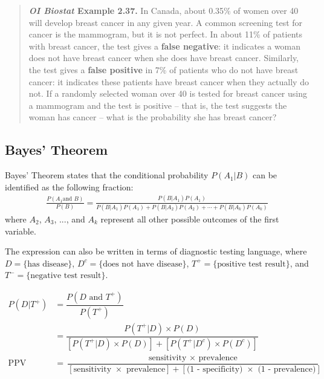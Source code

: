 \documentclass{report}\usepackage[]{graphicx}\usepackage[]{color}
\begin{document}
\begin{quotation}

\textbf{\textit{OI Biostat} Example 2.37.} In Canada, about 0.35\% of women over 40 will develop breast cancer in any given year. A common screening test for cancer is the mammogram, but it is not perfect. In about 11\% of patients with breast cancer, the test gives a \textbf{false negative}: it indicates a woman does not have breast cancer when she does have breast cancer. Similarly, the test gives a \textbf{false positive} in 7\% of patients who do not have breast cancer: it indicates these patients have breast cancer when they actually do not. If a randomly selected woman over 40 is tested for breast cancer using a mammogram and the test is positive -- that is, the test suggests the woman has cancer -- what is the probability she has breast cancer?

\end{quotation}

\subsection{Bayes' Theorem}

Bayes' Theorem states that the conditional probability $P(A_1 | B)$ can be identified as the following fraction:\vspace{-1.5mm}
\begin{align*}
\frac{P(A_1 \text{and } B)}{P(B)}= \frac{P(B | A_1) P(A_1)}
	{P(B | A_1) P(A_1) + P(B | A_2) P(A_2) + \cdots + P(B | A_k) P(A_k)}
\end{align*}
where $A_2$, $A_3$, ..., and $A_k$ represent all other possible outcomes of the first variable.

The expression can also be written in terms of diagnostic testing language, where $D = \text{\{has disease\}}$, $D^c = \text{\{does not have disease\}}$, $T^{+} = \text{\{positive test result\}}$, and $T^{-} = \text{\{negative test result\}}$.

\begin{align*}
P(D|T^{+}) &= \dfrac{P(D \text{ and } T^{+})}{P(T^+)} \\
&= \dfrac{P(T^{+}|D) \times P(D)}{[P(T^{+}|D) \times P(D)] + [P(T^{+}|D^c) \times P(D^c)]} \\
\text{PPV} &= \dfrac{\text{sensitivity } \times \text{ prevalence}}{[\text{sensitivity } \times \text{ prevalence}] + [\text{(1 - specificity) } \times \text{ (1 - prevalence)}]}
\end{align*}
\end{document}
